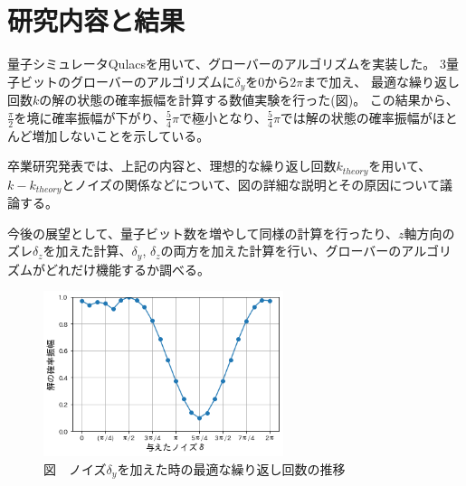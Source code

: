 \documentclass[platex,dvipdfmx, twocolumn]{jsarticle}			%
\begin{document}

\section{研究内容と結果}
量子シミュレータQulacsを用いて、グローバーのアルゴリズムを実装した。
3量子ビットのグローバーのアルゴリズムに$\delta_y$を$0$から$2\pi$まで加え、
最適な繰り返し回数$k$の解の状態の確率振幅を計算する数値実験を行った(図)。
この結果から、$\frac{\pi}{2}$を境に確率振幅が下がり、$\frac{5}{4}\pi$で極小となり、$\frac{5}{4}\pi$では解の状態の確率振幅がほとんど増加しないことを示している。

卒業研究発表では、上記の内容と、理想的な繰り返し回数$k_{theory}$を用いて、$k - k_{theory}$とノイズの関係などについて、図の詳細な説明とその原因について議論する。

今後の展望として、量子ビット数を増やして同様の計算を行ったり、$z$軸方向のズレ$\delta_z$を加えた計算、$\delta_y$, $\delta_z$の両方を加えた計算を行い、グローバーのアルゴリズムがどれだけ機能するか調べる。

\begin{figure}
\centering
\includegraphics[width=70mm]{figures/sample.png}
\caption*{図　ノイズ$\delta_y$を加えた時の最適な繰り返し回数の推移}
\label{fig:P(k)}
\end{figure}



\end{document}
